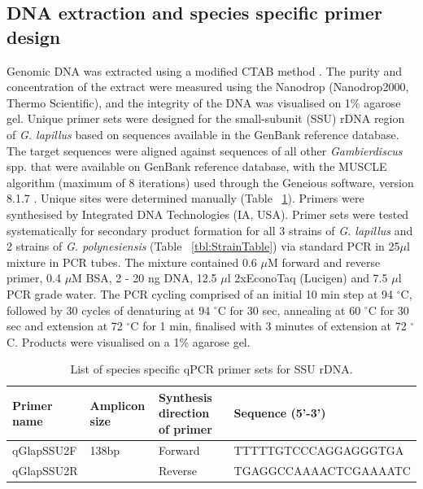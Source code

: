 \documentclass[12pt]{article}
\begin{document}
\subsection*{DNA extraction and species specific primer design}
\FloatBarrier
Genomic DNA was extracted using a modified CTAB method \citep{verma2016molecular}. 
The purity and concentration of the extract were measured using the Nanodrop (Nanodrop2000, Thermo Scientific), and the integrity of the DNA was visualised on 1\% agarose gel.
Unique primer sets were designed for the small-subunit (SSU) rDNA region of \emph{G. lapillus} %
based on sequences available in the GenBank reference database. 
The target sequences were aligned against sequences of all other \emph{Gambierdiscus} spp. that were available on GenBank reference database, with the MUSCLE algorithm (maximum of 8 iterations) \citep{edgar2004muscle} used through the Geneious software, version 8.1.7 \citep{kearse2012geneious}. 
Unique sites were determined manually (Table ~\ref{tbl:PrimerTable}). 
Primers were synthesised by Integrated DNA Technologies (IA, USA).
Primer sets were tested systematically for secondary product formation for all 3 strains of \emph{G. lapillus} and 2 strains of \emph{G. polynesiensis} (Table ~\ref{tbl:StrainTable}) via standard PCR in 25$\mu$l mixture in PCR tubes. 
The mixture contained 0.6 $\mu$M forward and reverse primer, 0.4 $\mu$M BSA, 2 - 20 ng DNA, 12.5 $\mu$l 2xEconoTaq (Lucigen) and 7.5 $\mu$l PCR grade water.
The PCR cycling comprised of an initial 10 min step at 94 $^{\circ}$C, followed by 30 cycles of denaturing at 94 $^{\circ}$C for 30 sec, annealing at 60 $^{\circ}$C for 30 sec and extension at 72 $^{\circ}$C for 1 min, finalised with 3 minutes of extension at 72 $^{\circ}$C. 
Products were visualised on a 1\% agarose gel.
\begin{table}
\caption{List of species specific qPCR primer sets for SSU rDNA.}
\label{tbl:PrimerTable}
\begin{tabular}{ | p{2.5cm} | p{2cm} | p{2cm} | p{6.5cm} | }
\hline
\textbf{Primer name} &\textbf{Amplicon size} &  \textbf{Synthesis direction of primer} & \textbf{Sequence (5'-3')} \\
\hline
qGlapSSU2F&138bp&Forward&TTTTTGTCCCAGGAGGGTGA\\
\hline
qGlapSSU2R&&Reverse&TGAGGCCAAAACTCGAAAATC\\
\hline
\end{tabular}
\end{table}
\FloatBarrier
\end{document}
